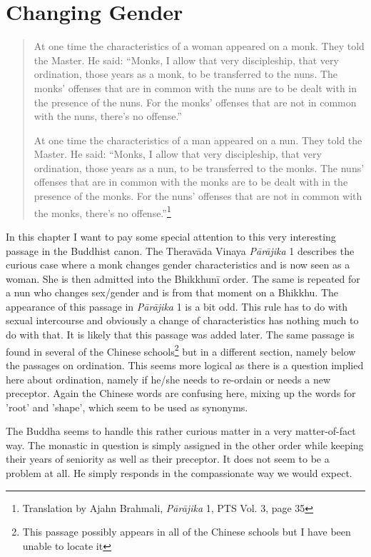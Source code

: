 \section{Changing Gender}

\begin{quote}
At one time the characteristics of a woman appeared on a monk. They told the Master. He said: “Monks, I allow that very discipleship, that very ordination, those years as a monk, to be transferred to the nuns. The monks’ offenses that are in common with the nuns are to be dealt with in the presence of the nuns. For the monks’ offenses that are not in common with the nuns, there’s no offense.”

At one time the characteristics of a man appeared on a nun. They told the Master. He said: “Monks, I allow that very discipleship, that very ordination, those years as a nun, to be transferred to the monks. The nuns’ offenses that are in common with the monks are to be dealt with in the presence of the monks. For the nuns’ offenses that are not in common with the monks, there’s no offense.”\footnote{Translation by Ajahn Brahmali, {\em Pā­rāji­ka} 1, PTS Vol. 3, page 35}
\end{quote}

In this chapter I want to pay some special attention to this very interesting passage in the Buddhist canon. The Theravāda Vinaya {\em Pā­rāji­ka} 1 describes the curious case where a monk changes gender characteristics and is now seen as a woman. She is then admitted into the Bhikkhunī order. The same is repeated for a nun who changes sex/gender and is from that moment on a Bhikkhu. The appearance of this passage in {\em Pārājika} 1 is a bit odd. This rule has to do with sexual intercourse and obviously a change of characteristics has nothing much to do with that. It is likely that this passage was added later. The same passage is found in several of the Chinese schools\footnote{This passage possibly appears in all of the Chinese schools but I have been unable to locate it} but in a different section, namely below the passages on ordination. This seems more logical as there is a question implied here about ordination, namely if he/she needs to re-ordain or needs a new preceptor. Again the Chinese words are confusing here, mixing up the words for 'root' and 'shape', which seem to be used as synonyms.

The Buddha seems to handle this rather curious matter in a very matter-of-fact way. The monastic in question is simply assigned in the other order while keeping their years of seniority as well as their preceptor. It does not seem to be a problem at all. He simply responds in the compassionate way we would expect.

